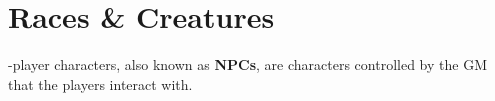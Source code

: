 \chapter{Races \& Creatures}

-player characters, also known as \textbf{NPCs}, are characters controlled by the GM that the players interact with. 